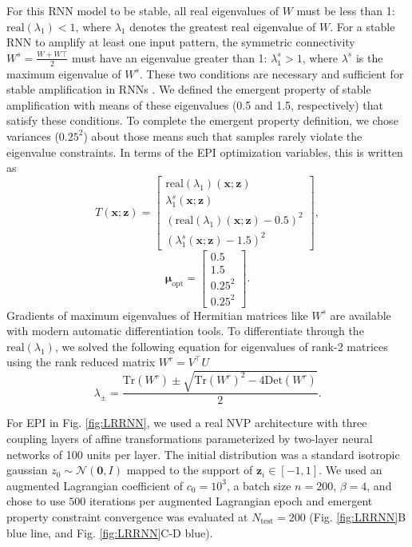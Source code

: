 \documentclass[11pt]{article}
\begin{document}
For this RNN model to be stable, all real eigenvalues of $W$ must be less than 1:  $\text{real}(\lambda_1) < 1$, where $\lambda_1$ denotes the greatest real eigenvalue of $W$.
For a stable RNN to amplify at least one input pattern, the symmetric connectivity $W^s = \frac{W + W\top}{2}$ must have an eigenvalue greater than 1:
$\lambda^s_1 > 1$, where  $\lambda^s$ is the maximum eigenvalue of $W^s$.
These two conditions are necessary and sufficient for stable amplification in RNNs \cite{bondanelli2020coding}.
We defined the emergent property of stable amplification with means of these eigenvalues (0.5 and 1.5, respectively) that satisfy these conditions.
To complete the emergent property definition, we chose variances ($0.25^2$) about those means such that samples rarely violate the eigenvalue constraints.
In terms of the EPI optimization variables, this is written as
\begin{equation} 
T(\mathbf{x}; \mathbf{z}) = \begin{bmatrix} \text{real}(\lambda_1)(\mathbf{x}; \mathbf{z}) \\ \lambda_1^s(\mathbf{x}; \mathbf{z}) \\ \left(\text{real}(\lambda_1)(\mathbf{x}; \mathbf{z}) - 0.5 \right)^2 \\ \left( \lambda_1^s(\mathbf{x}; \mathbf{z})  - 1.5 \right)^2 \end{bmatrix},
\end{equation}
\begin{equation} 
\bm{\mu}_{\text{opt}} = \begin{bmatrix} 0.5 \\ 1.5 \\ 0.25^2 \\ 0.25^2 \end{bmatrix}.
\end{equation}
Gradients of maximum eigenvalues of Hermitian matrices like $W^s$ are available with modern automatic differentiation tools.
To differentiate through the $\text{real}(\lambda_1)$, we solved the following equation for eigenvalues of rank-2 matrices using the rank reduced matrix $W^r = V^{\top} U$
\begin{equation}
\lambda_{\pm} = \frac{\text{Tr}(W^r) \pm \sqrt{\text{Tr}(W^r)^2 - 4\text{Det}(W^r)}}{2}.
\end{equation}

For EPI in Fig. \ref{fig:LRRNN}, we used a real NVP architecture with three coupling layers of affine transformations parameterized by two-layer neural networks of 100 units per layer.
The initial distribution was a standard isotropic gaussian $z_0 \sim \mathcal{N}(\mathbf{0}, I)$ mapped to the support of $\mathbf{z}_i \in [-1, 1]$. 
We used an augmented Lagrangian coefficient of $c_0 = 10^{3}$, a batch size $n=200$, $\beta=4$, and chose to use $500$ iterations per augmented Lagrangian epoch and emergent property constraint convergence was evaluated at $N_{\text{test}} = 200$ (Fig. \ref{fig:LRRNN}B blue line, and Fig. \ref{fig:LRRNN}C-D blue).
\end{document}
